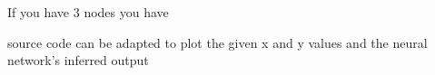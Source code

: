 \documentclass[a4paper, 10pt]{IEEEconf}
\begin{document}
If you have 3 nodes you have 

source code can be adapted to plot the given x and y values and the neural network's inferred output

%
%
%
%
%
%
%
%
\end{document}

